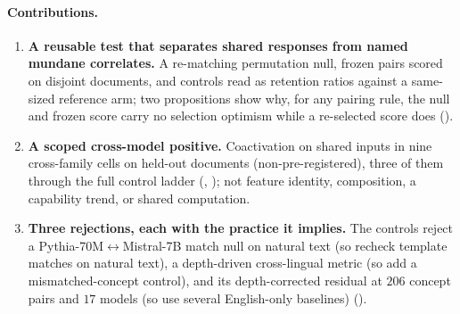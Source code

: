 \paragraph{Contributions.}
\begin{enumerate}[leftmargin=*,topsep=2pt,itemsep=1pt]
  \item \textbf{A reusable test that separates shared responses from named mundane correlates.} A
  re-matching permutation null, frozen pairs scored on disjoint documents, and controls read as retention
  ratios against a same-sized reference arm; two propositions show why, for any pairing rule, the null and
  frozen score carry no selection optimism while a re-selected score does ().
  \item \textbf{A scoped cross-model positive.} Coactivation on shared inputs in nine
  cross-family cells on held-out documents (non-pre-registered), three of them through the full control ladder (,
  ); not feature identity, composition, a capability trend, or shared computation.
  \item \textbf{Three rejections, each with the practice it implies.} The controls reject a
  Pythia-70M$\leftrightarrow$Mistral-7B match null on natural text (so recheck template matches on
  natural text), a depth-driven cross-lingual metric (so add a mismatched-concept control), and its
  depth-corrected residual at $206$ concept pairs and $17$ models (so use several English-only
  baselines) ().
\end{enumerate}
